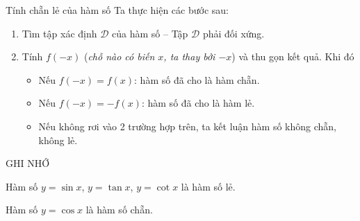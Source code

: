 \begin{dang}{Tính chẵn lẻ của hàm số}
	Ta thực hiện các bước sau:
	\begin{enumerate}
		\item[\ding{172}] Tìm tập xác định $\mathscr{D}$ của hàm số -- Tập $\mathscr{D}$ phải đối xứng.
		\item[\ding{173}] Tính $f\left(-x\right)$ (\textit{chỗ nào có biến $x$, ta thay bởi $-x$}) và thu gọn kết quả. Khi đó
		      \begin{itemize}
			      \item [$\bullet$] Nếu $f(-x)=f(x)$: hàm số đã cho là hàm chẵn.
			      \item [$\bullet$] Nếu $f(-x)=-f(x)$: hàm số đã cho là hàm lẻ.
			      \item [$\bullet$] Nếu không rơi vào 2 trường hợp trên, ta kết luận hàm số không chẵn, không lẻ.
		      \end{itemize}
	\end{enumerate}

	\begin{khung4}{GHI NHỚ}
		\begin{listEX}[1]
			\item [\ding{172}] Hàm số $y=\sin x$, $y=\tan x$, $y=\cot x$ là hàm số lẻ.
			\item [\ding{173}] Hàm số $y=\cos x$ là hàm số chẵn.
		\end{listEX}
	\end{khung4}
\end{dang}

